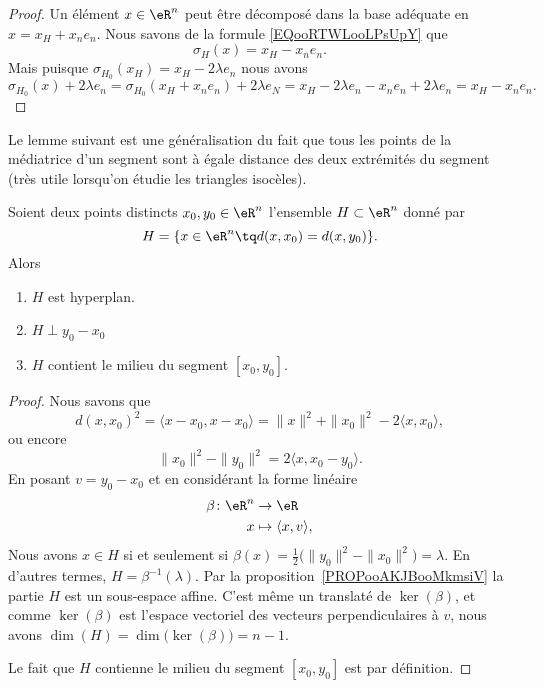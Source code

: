 \begin{proof}
	Un élément \( x\in \eR^n\) peut être décomposé dans la base adéquate en \( x=x_H+x_ne_n\). Nous savons de la formule \eqref{EQooRTWLooLPsUpY} que
	\begin{equation}
		\sigma_H(x)=x_H-x_ne_n.
	\end{equation}
	Mais puisque \( \sigma_{H_0}(x_H)=x_H-2\lambda e_n\) nous avons
	\begin{equation}
		\sigma_{H_0}(x)+2\lambda e_n=\sigma_{H_0}(x_H+x_ne_n)+2\lambda e_N=x_H-2\lambda e_n-x_ne_n+2\lambda e_n=x_H-x_ne_n.
	\end{equation}
\end{proof}

Le lemme suivant est une généralisation du fait que tous les points de la médiatrice d'un segment sont à égale distance des deux extrémités du segment (très utile lorsqu'on étudie les triangles isocèles).
\begin{lemma}        \label{LEMooDPLYooJKZxiM}
	Soient deux points distincts \( x_0,y_0\in \eR^n\) l'ensemble \( H\subset \eR^n\) donné par
	\begin{equation}
		H=\{ x\in \eR^n\tq d(x,x_0)=d(x,y_0) \}.
	\end{equation}
    Alors
    \begin{enumerate}
        \item
            \( H\) est hyperplan.
        \item
            \( H\perp  y_0-x_0\)
        \item
            \( H\) contient le milieu du segment \( [x_0,y_0]\).
    \end{enumerate}
\end{lemma}

\begin{proof}
	Nous savons que
	\begin{equation}
		d(x,x_0)^2=\langle x-x_0, x-x_0\rangle =\| x \|^2+\| x_0 \|^2-2\langle x, x_0\rangle,
	\end{equation}
	ou encore
	\begin{equation}
		\| x_0 \|^2-\| y_0 \|^2=2\langle x, x_0-y_0\rangle .
	\end{equation}
	En posant \( v=y_0-x_0\) et en considérant la forme linéaire
	\begin{equation}
		\begin{aligned}
			\beta\colon \eR^n & \to \eR                       \\
			x                 & \mapsto \langle x, v\rangle ,
		\end{aligned}
	\end{equation}
	Nous avons \( x\in H\) si et seulement si \( \beta(x)=\frac{ 1 }{2}\big( \| y_0 \|^2-\| x_0 \|^2 \big)=\lambda\). En d'autres termes, \( H=\beta^{-1}(\lambda)\). Par la proposition~\ref{PROPooAKJBooMkmsiV} la partie \( H\) est un sous-espace affine. C'est même un translaté de \( \ker(\beta)\), et comme \( \ker(\beta)\) est l'espace vectoriel des vecteurs perpendiculaires à \( v\), nous avons \( \dim(H)=\dim\big( \ker(\beta) \big)=n-1\).

	Le fait que \( H\) contienne le milieu du segment \( [x_0,y_0]\) est par définition.
\end{proof}

